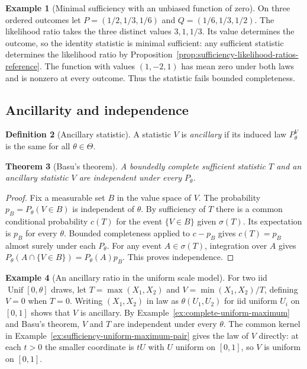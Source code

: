 \documentclass[11pt,oneside]{book}
\newtheorem{theorem}{Theorem}[chapter]
\theoremstyle{definition}
\newtheorem{definition}[theorem]{Definition}
\newtheorem{example}[theorem]{Example}
\theoremstyle{remark}
\begin{document}
\begin{example}[Minimal sufficiency with an unbiased function of zero]
\label{ex:minimal-sufficient-incomplete-three}
On three ordered outcomes let $P=(1/2,1/3,1/6)$ and
$Q=(1/6,1/3,1/2)$. The likelihood ratio takes the three distinct
values $3,1,1/3$. Its value determines the outcome, so the identity
statistic is minimal sufficient: any sufficient statistic
determines the likelihood ratio by
Proposition~\ref{prop:sufficiency-likelihood-ratios-reference}.
The function with values $(1,-2,1)$ has mean zero under both
laws and is nonzero at every outcome. Thus the statistic fails
bounded completeness.
\end{example}

\subsection{Ancillarity and independence}
\label{subsec:statistic-ancillarity}

\begin{definition}[Ancillary statistic]
\label{def:ancillary-statistic}
A statistic $V$ is \emph{ancillary} if its induced law $P_\theta^V$
is the same for all $\theta\in\Theta$.
\end{definition}

\begin{theorem}[Basu's theorem]
\label{thm:basu-independence}
A boundedly complete sufficient statistic $T$ and an ancillary
statistic $V$ are independent under every $P_\theta$.
\end{theorem}
\begin{proof}
Fix a measurable set $B$ in the value space of $V$. The probability
$p_B=P_\theta(V\in B)$ is independent of $\theta$. By sufficiency
of $T$ there is a common conditional probability $c(T)$ for the
event $\{V\in B\}$ given $\sigma(T)$. Its expectation is $p_B$
for every $\theta$. Bounded completeness applied to $c-p_B$
gives $c(T)=p_B$ almost surely under each $P_\theta$.
For any event $A\in\sigma(T)$, integration over $A$ gives
$P_\theta(A\cap\{V\in B\})=P_\theta(A)p_B$. This proves independence.
\end{proof}

\begin{example}[An ancillary ratio in the uniform scale model]
\label{ex:basu-uniform-ratio}
For two iid $\operatorname{Unif}[0,\theta]$ draws, let
$T=\max(X_1,X_2)$ and $V=\min(X_1,X_2)/T$, defining $V=0$ when
$T=0$. Writing $(X_1,X_2)$ in law as $\theta(U_1,U_2)$ for iid
uniform $U_i$ on $[0,1]$ shows that $V$ is ancillary.
By Example~\ref{ex:complete-uniform-maximum} and Basu's theorem,
$V$ and $T$ are independent under every $\theta$. The common
kernel in Example~\ref{ex:sufficiency-uniform-maximum-pair}
gives the law of $V$ directly: at each $t>0$ the smaller
coordinate is $tU$ with $U$ uniform on $[0,1]$, so $V$ is uniform
on $[0,1]$.
\end{example}
\end{document}
